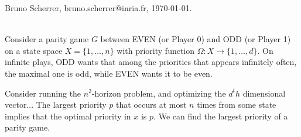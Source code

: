 \documentclass{article}
\begin{document}
\noindent Bruno Scherrer, bruno.scherrer@inria.fr, \today.

~\\

Consider a parity game $G$ between EVEN (or Player 0) and ODD (or Player 1) on a state space $X=\{1,\dots,n\}$ with priority function $\Omega:X \to \{1,\dots,d\}$. On infinite plays, ODD wants that among the priorities that appears infinitely often, the maximal one is odd, while EVEN wants it to be even.


Consider running the $n^2$-horizon problem, and optimizing the $d^th$ dimensional vector... The largest priority $p$ that occurs at most $n$ times from some state implies that the optimal priority in $x$ is $p$. We can find the largest priority of a parity game.


 
\end{document}
